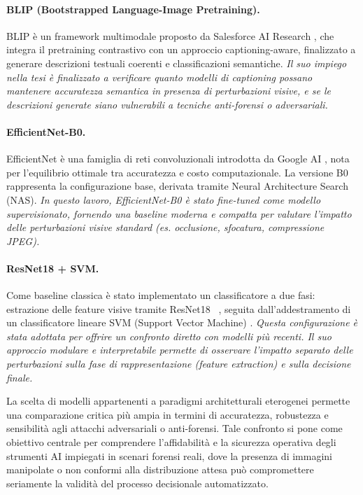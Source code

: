 \paragraph{BLIP (Bootstrapped Language-Image Pretraining).} BLIP è un framework multimodale proposto da Salesforce AI Research \cite{li2020learning}, che integra il pretraining contrastivo con un approccio captioning-aware, finalizzato a generare descrizioni testuali coerenti e classificazioni semantiche.  
\textit{Il suo impiego nella tesi è finalizzato a verificare quanto modelli di captioning possano mantenere accuratezza semantica in presenza di perturbazioni visive, e se le descrizioni generate siano vulnerabili a tecniche anti-forensi o adversariali.}

\paragraph{EfficientNet-B0.} EfficientNet è una famiglia di reti convoluzionali introdotta da Google AI \cite{tan2019efficientnet}, nota per l’equilibrio ottimale tra accuratezza e costo computazionale. La versione B0 rappresenta la configurazione base, derivata tramite Neural Architecture Search (NAS).  
\textit{In questo lavoro, EfficientNet-B0 è stato fine-tuned come modello supervisionato, fornendo una baseline moderna e compatta per valutare l’impatto delle perturbazioni visive standard (es. occlusione, sfocatura, compressione JPEG).}

\paragraph{ResNet18 + SVM.} Come baseline classica è stato implementato un classificatore a due fasi: estrazione delle feature visive tramite ResNet18 ~\cite{he2016deep}, seguita dall’addestramento di un classificatore lineare SVM (Support Vector Machine) \cite{cortes1995support}.  
\textit{Questa configurazione è stata adottata per offrire un confronto diretto con modelli più recenti. Il suo approccio modulare e interpretabile permette di osservare l’impatto separato delle perturbazioni sulla fase di rappresentazione (feature extraction) e sulla decisione finale.}

\bigskip

La scelta di modelli appartenenti a paradigmi architetturali eterogenei permette una comparazione critica più ampia in termini di accuratezza, robustezza e sensibilità agli attacchi adversariali o anti-forensi. Tale confronto si pone come obiettivo centrale per comprendere l’affidabilità e la sicurezza operativa degli strumenti AI impiegati in scenari forensi reali, dove la presenza di immagini manipolate o non conformi alla distribuzione attesa può compromettere seriamente la validità del processo decisionale automatizzato.




